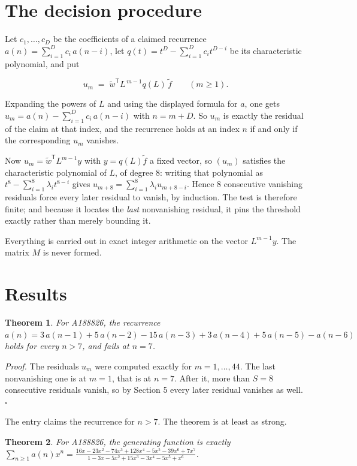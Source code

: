 \documentclass[11pt]{article}
\newtheorem{theorem}{Theorem}
\theoremstyle{definition}
\begin{document}
\section{The decision procedure}

Let $c_1,\dots,c_D$ be the coefficients of a claimed recurrence $a(n) = \sum_{i=1}^{D} c_i\,a(n-i)$, let $q(t) = t^{D} - \sum_{i=1}^{D} c_i t^{D-i}$ be its characteristic polynomial, and put

\[u_m \;=\; \tilde w^{\mathsf T} L^{\,m-1} q(L)\,\tilde f \qquad (m \ge 1).\]

Expanding the powers of $L$ and using the displayed formula for $a$, one gets $u_m = a(n) - \sum_{i=1}^{D} c_i\,a(n-i)$ with $n = m + D$. So $u_m$ is exactly the residual of the claim at that index, and the recurrence holds at an index $n$ if and only if the corresponding $u_m$ vanishes.

Now $u_m = \tilde w^{\mathsf T} L^{m-1} y$ with $y = q(L)\tilde f$ a fixed vector, so $(u_m)$ satisfies the characteristic polynomial of $L$, of degree $8$: writing that polynomial as $t^{8} - \sum_{i=1}^{8} \lambda_i t^{8-i}$ gives $u_{m+8} = \sum_{i=1}^{8} \lambda_i u_{m+8-i}$. Hence $8$ consecutive vanishing residuals force every later residual to vanish, by induction. The test is therefore finite; and because it locates the {\itshape last} nonvanishing residual, it pins the threshold exactly rather than merely bounding it.

Everything is carried out in exact integer arithmetic on the vector $L^{m-1}y$. The matrix $M$ is never formed.

\section{Results}

\begin{theorem} For A188826, the recurrence $a(n) = 3\,a(n-1) + 5\,a(n-2) - 15\,a(n-3) + 3\,a(n-4) + 5\,a(n-5) - a(n-6)$ holds for every $n > 7$, and fails at $n = 7$.\end{theorem}

{\itshape Proof.} The residuals $u_m$ were computed exactly for $m = 1,\dots,44$. The last nonvanishing one is at $m = 1$, that is at $n = 7$. After it, more than $S = 8$ consecutive residuals vanish, so by Section 5 every later residual vanishes as well. $\square$

The entry claims the recurrence for $n > 7$. The theorem is at least as strong.

\begin{theorem} For A188826, the generating function is exactly $\sum_{n\ge 1} a(n)x^n = \frac{16x - 23x^{2} - 74x^{3} + 128x^{4} - 5x^{5} - 39x^{6} + 7x^{7}}{1 - 3x - 5x^{2} + 15x^{3} - 3x^{4} - 5x^{5} + x^{6}}$.\end{theorem}
\end{document}
